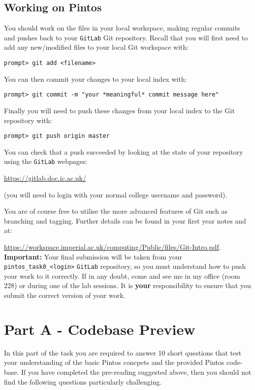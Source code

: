 \documentclass[a4paper,12pt]{article}
\newcommand{\shell}[1]{\lstinline!#1!}
\begin{document}
\subsection*{Working on Pintos}
You should work on the files in your local workspace, making regular commits and pushes back to your \shell{GitLab} Git repository.
Recall that you will first need to add any new/modified files to your local Git workspace with:
%
\begin{lstlisting}[style=shell]
  prompt> git add <filename>
\end{lstlisting}
%
You can then commit your changes to your local index with:
%
\begin{lstlisting}[style=shell]
  prompt> git commit -m "your *meaningful* commit message here"
\end{lstlisting}
%
Finally you will need to push these changes from your local index to the Git repository with:
%
\begin{lstlisting}[style=shell]
  prompt> git push origin master
\end{lstlisting}
%
You can check that a push succeeded by looking at the state of your repository using the \shell{GitLab} webpages: 

\url{https://gitlab.doc.ic.ac.uk/}

\noindent (you will need to login with your normal college username and password).

You are of course free to utilise the more advanced features of Git such as branching and tagging.
Further details can be found in your first year notes and at:

\url{https://workspace.imperial.ac.uk/computing/Public/files/Git-Intro.pdf}.\\

{\bf Important:} Your final submission will be taken from your \shell{pintos_task0_<login>} \shell{GitLab} repository, 
so you must understand how to push your work to it correctly. 
If in any doubt, come and see me in my office (room 228) or during one of the lab sessions.
It is {\bf your} responsibility to ensure that you submit the correct version of your work.


\section*{Part A - Codebase Preview}
In this part of the task you are required to answer 10 short questions that test your understanding of the basic Pintos concpets 
and the provided Pintos code-base.
If you have completed the pre-reading suggested above, then you should not find the following questions particularly challenging.
\end{document}
